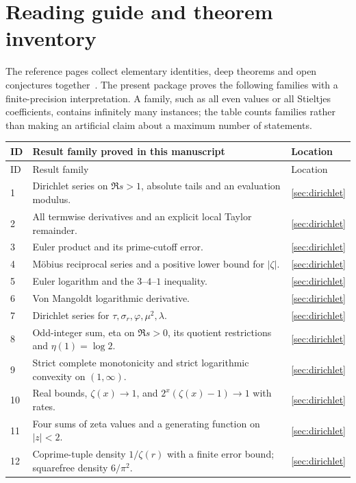 \documentclass[11pt,letterpaper]{article}
\theoremstyle{definition}
\begin{document}
\section*{Reading guide and theorem inventory}
The reference pages collect elementary identities, deep theorems and
open conjectures together~\cite{Wikipedia,MathWorld}. The present package
proves the following families with a finite-precision interpretation.
A family, such as all even values or all Stieltjes coefficients, contains
infinitely many instances; the table counts families rather than making
an artificial claim about a maximum number of statements.

\begin{longtable}{p{}p{}p{}}
\toprule
ID & Result family proved in this manuscript & Location\\\midrule
\endfirsthead
\toprule ID & Result family & Location\\\midrule
\endhead
1 & Dirichlet series on $\Re s>1$, absolute tails and an evaluation modulus. & \ref{sec:dirichlet}\\
2 & All termwise derivatives and an explicit local Taylor remainder. & \ref{sec:dirichlet}\\
3 & Euler product and its prime-cutoff error. & \ref{sec:dirichlet}\\
4 & M\"obius reciprocal series and a positive lower bound for $|\zeta|$. & \ref{sec:dirichlet}\\
5 & Euler logarithm and the $3$--$4$--$1$ inequality. & \ref{sec:dirichlet}\\
6 & Von Mangoldt logarithmic derivative. & \ref{sec:dirichlet}\\
7 & Dirichlet series for $\tau,\sigma_r,\varphi,\mu^2,\lambda$. & \ref{sec:dirichlet}\\
8 & Odd-integer sum, eta on $\Re s>0$, its quotient restrictions and $\eta(1)=\log2$. & \ref{sec:dirichlet}\\
9 & Strict complete monotonicity and strict logarithmic convexity on $(1,\infty)$. & \ref{sec:dirichlet}\\
10 & Real bounds, $\zeta(x)\to1$, and $2^x(\zeta(x)-1)\to1$ with rates. & \ref{sec:dirichlet}\\
11 & Four sums of zeta values and a generating function on $|z|<2$. & \ref{sec:dirichlet}\\
12 & Coprime-tuple density $1/\zeta(r)$ with a finite error bound; squarefree density $6/\pi^2$. & \ref{sec:dirichlet}\\

\end{longtable}
\end{document}
